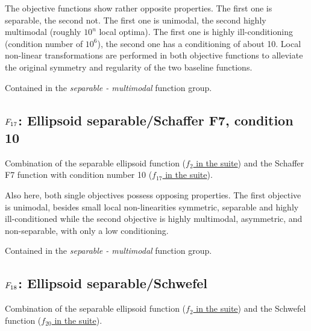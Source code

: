 The objective functions show rather opposite properties.
The first one is separable, the second not. The first one
is unimodal, the second highly multimodal (roughly \(10^n\) local
optima). The first one is highly ill-conditioning (condition number of
\(10^6\)), the second one has a conditioning of about 10. Local
non-linear transformations are performed in both objective functions
to alleviate the original symmetry and regularity of the two
baseline functions.

Contained in the \emph{separable - multimodal} function group.



\subsection[\texorpdfstring{\protect\(F_{17}\protect\): Ellipsoid separable/Schaffer F7, condition 10}{F17: Ellipsoid separable/Schaffer F7, condition 10}]{\texorpdfstring{\protect\(F_{17}\protect\): Ellipsoid separable/Schaffer F7, condition 10}{}}
\label{index:ellipsoid-separable-schaffer-f7-condition-10}\label{index:f17}
Combination of the separable ellipsoid function (\href{https://coco.gforge.inria.fr/downloads/download16.00/bbobdocfunctions.pdf\#page=10}{\(f_2\) in the \bbob suite}) and the Schaffer F7 function with condition number 10
(\href{https://coco.gforge.inria.fr/downloads/download16.00/bbobdocfunctions.pdf\#page=85}{\(f_{17}\) in the \bbob suite}).

Also here, both single objectives possess opposing properties.
The first objective is unimodal, besides small local non-linearities symmetric,
separable and highly ill-conditioned while the second objective is highly
multimodal, asymmetric, and non-separable, with only a low conditioning.

Contained in the \emph{separable - multimodal} function group.



\subsection[\texorpdfstring{\protect\(F_{18}\protect\): Ellipsoid separable/Schwefel}{F18: Ellipsoid separable/Schwefel}]{\texorpdfstring{\protect\(F_{18}\protect\): Ellipsoid separable/Schwefel}{}}
\label{index:ellipsoid-separable-schwefel}\label{index:f18}
Combination of the separable ellipsoid function (\href{https://coco.gforge.inria.fr/downloads/download16.00/bbobdocfunctions.pdf\#page=10}{\(f_2\) in the \bbob suite}) and the Schwefel function (\href{https://coco.gforge.inria.fr/downloads/download16.00/bbobdocfunctions.pdf\#page=100}{\(f_{20}\) in the \bbob suite}).

